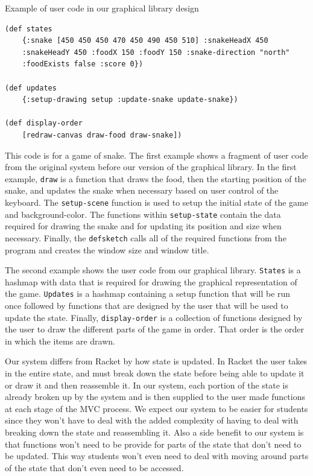 \documentclass[12pt]{article}
\begin{document}
Example of user code in our graphical library design
\begin{verbatim}
(def states 
	{:snake [450 450 450 470 450 490 450 510] :snakeHeadX 450 
	:snakeHeadY 450 :foodX 150 :foodY 150 :snake-direction "north" 
	:foodExists false :score 0})
	
(def updates
	{:setup-drawing setup :update-snake update-snake})
	
(def display-order
	[redraw-canvas draw-food draw-snake])
\end{verbatim}
This code is for a game of snake. The first example shows a fragment of user code from the original system before our version of the graphical library. In the first example, \texttt{draw} is a function that draws the food, then the starting position of the snake, and updates the snake when necessary based on user control of the keyboard. The \texttt{setup-scene} function is used to setup the initial state of the game and background-color. The functions within \texttt{setup-state} contain the data required for drawing the snake and for updating its position and size when necessary. Finally, the \texttt{defsketch} calls all of the required functions from the program and creates the window size and window title. 

The second example shows the user code from our graphical library. \texttt{States} is a hashmap with data that is required for drawing the graphical representation of the game. \texttt{Updates} is a hashmap containing a setup function that will be run once followed by functions that are designed by the user that will be used to update the state. Finally, \texttt{display-order} is a collection of functions designed by the user to draw the different parts of the game in order. That order is the order in which the items are drawn.

Our system differs from Racket by how state is updated. In Racket the user takes in the entire state, and must break down the state before being able to update it or draw it and then reassemble it. In our system, each portion of the state is already broken up by the system and is then supplied to the user made functions at each stage of the MVC process. We expect our system to be easier for students since they won't have to deal with the added complexity of having to deal with breaking down the state and reassembling it. Also a side benefit to our system is that functions won't need to be provide for parts of the state that don't need to be updated. This way students won't even need to deal with moving around parts of the state that don't even need to be accessed.
\end{document}
